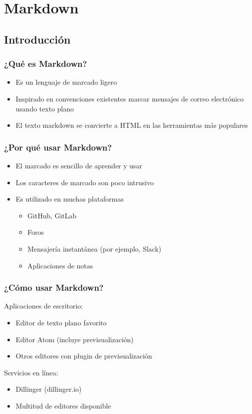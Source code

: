 \documentclass[svgnames]{beamer}
\begin{document}
\section{Markdown}

\subsection{Introducción}

\begin{frame}
  \frametitle{¿Qué es Markdown?}
  \begin{itemize}
    \item Es un lenguaje de marcado ligero
    \item Inspirado en convenciones existentes marcar mensajes de correo electrónico usando texto plano
    \item El texto markdown se convierte a HTML en las herramientas más populares
  \end{itemize}\pause
\end{frame}

\begin{frame}
  \frametitle{¿Por qué usar Markdown?}
  \begin{itemize}
    \item El marcado es sencillo de aprender y usar
    \item Los caracteres de marcado son poco intrusivo
    \item Es utilizado en muchas plataformas
    \begin{itemize}
      \item GitHub, GitLab
      \item Foros
      \item Mensajería instantánea (por ejemplo, Slack)
      \item Aplicaciones de notas
    \end{itemize}
  \end{itemize}
\end{frame}

\begin{frame}
  \frametitle{¿Cómo usar Markdown?}
  Aplicaciones de escritorio:
  \begin{itemize}
    \item Editor de texto plano favorito
    \item Editor Atom (incluye previsualización)
    \item Otros editores con plugin de previsualización
  \end{itemize}
  \vfill
  Servicios en línea:
  \begin{itemize}
    \item Dillinger (dillinger.io)
    \item Multitud de editores disponible
  \end{itemize}
\end{frame}
\end{document}
